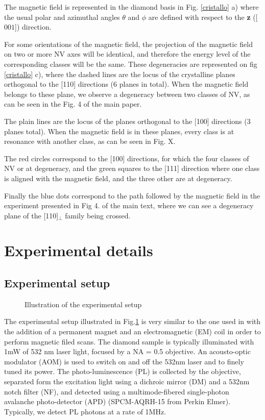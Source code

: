 \documentclass[preprintnumbers,amsmath,amssymb,onecolumn,12pt]{revtex4}
\begin{document}
The magnetic field is represented in the diamond basis in Fig. \ref{cristallo} a) where the usual polar and azimuthal angles $\theta$ and $\phi$ are defined with respect to the \textbf{z} ([$001$]) direction.

For some orientations of the magnetic field, the projection of the magnetic field on two or more NV axes will be identical, and therefore the energy level of the corresponding classes will be the same. These degeneracies are represented on fig \ref{cristallo} c), where the dashed lines are the locus of the crystalline planes orthogonal to the [110] directions (6 planes in total). When the magnetic field belongs to these plane, we observe a degeneracy between two classes of NV, as can be seen in the Fig. 4 of the main paper.

The plain lines are the locus of the planes orthogonal to the [100] directions (3 planes total). When the magnetic field is in these planes, every class is at resonance with another class, as can be seen in Fig. X.

The red circles correspond to the [100] directions, for which the four classes of NV or at degeneracy, and the green squares to the [111] direction where one class is aligned with the magnetic field, and the three other are at degeneracy.

Finally the blue dots correspond to the path followed by the magnetic field in the experiment presented in Fig 4. of the main text, where we can see a degeneracy plane of the [110]$_\perp$ family being crossed.

\section*{Experimental details}

\subsection{Experimental setup}

\begin{figure}[!ht]
  \centering {}
  \caption{Illustration of the experimental setup}
	\label{Optics}
\end{figure}

The experimental setup illustrated in Fig.\ref{Optics} is very similar to the one used in \citep{DelordPRL} with the addition of a permanent magnet and an electromagnetic (EM) coil in order to perform magnetic filed scans. The diamond sample is typically illuminated with 1mW of 532 nm laser light, focused by a NA = 0.5 objective. An acousto-optic modulator (AOM) is used to switch on and off the 532nm laser and to finely tuned its power. The photo-luminescence (PL) is collected by the objective, separated form the excitation light using a dichroic mirror (DM) and a 532nm notch filter (NF), and detected using a multimode-fibered single-photon avalanche photo-detector (APD) (SPCM-AQRH-15 from Perkin Elmer). Typically, we detect PL photons at a rate of 1MHz. 
\end{document}
